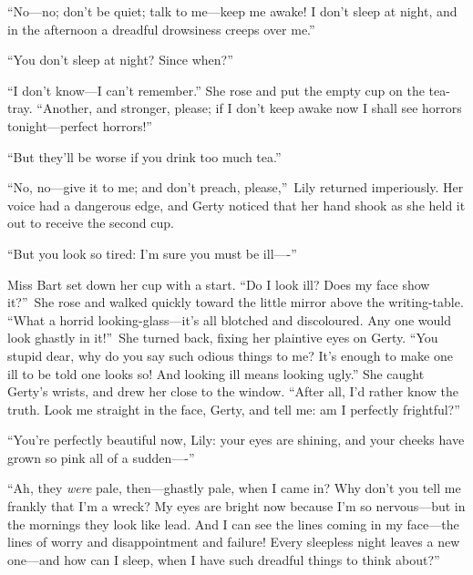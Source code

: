 \documentclass[12pt,a4paper]{book}
\begin{document}
``No---no; don't be quiet; talk to me---keep me awake! I don't sleep
at night, and in the afternoon a dreadful drowsiness creeps over
me.''





``You don't sleep at night? Since when?''





``I don't know---I can't remember.'' She rose and put the empty cup
on the tea-tray. ``Another, and stronger, please; if I don't keep
awake now I shall see horrors tonight---perfect horrors!''





``But they'll be worse if you drink too much tea.''





``No, no---give it to me; and don't preach, please,''\ Lily returned
imperiously. Her voice had a dangerous edge, and Gerty noticed
that her hand shook as she held it out to receive the second cup.





``But you look so tired: I'm sure you must be ill----''





Miss Bart set down her cup with a start. ``Do I look ill? Does my
face show it?''\ She rose and walked quickly toward the little
mirror above the writing-table. ``What a horrid
looking-glass---it's all blotched and discoloured. Any one would
look ghastly in it!''\ She turned back, fixing her plaintive eyes
on Gerty. ``You stupid dear, why do you say such odious things to
me? It's enough to make one ill to be told one looks so! And
looking ill means looking ugly.'' She caught Gerty's wrists, and
drew her close to the window. ``After all, I'd rather know the
truth. Look me straight in the face, Gerty, and tell me: am I
perfectly frightful?''





``You're perfectly beautiful now, Lily: your eyes are shining, and
your cheeks have grown so pink all of a sudden----''





``Ah, they \textit{were} pale, then---ghastly pale, when I came in? Why
don't you tell me frankly that I'm a wreck? My eyes are bright
now because I'm so nervous---but in the mornings they look like
lead. And I can see the lines coming in my face---the lines of
worry and disappointment and failure! Every sleepless night
leaves a new one---and how can I sleep, when I have such dreadful
things to think about?''
\end{document}
